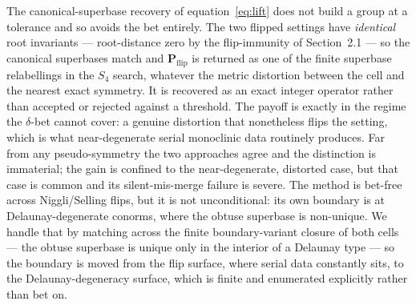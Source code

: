 \documentclass[11pt]{article}
\newcommand{\Pop}{\mathbf{P}}
\begin{document}
The canonical-superbase recovery of equation~\eqref{eq:lift} does not build a
group at a tolerance and so avoids the bet entirely. The two flipped settings have
\emph{identical} root invariants --- root-distance zero by the flip-immunity of
Section~2.1 --- so the canonical superbases match and $\Pop_{\mathrm{flip}}$ is
returned as one of the finite superbase relabellings in the $S_4$ search, whatever
the metric distortion between the cell and the nearest exact symmetry. It is
recovered as an exact integer operator rather than accepted or rejected against a
threshold. The payoff is exactly in the regime the $\delta$-bet cannot cover: a
genuine distortion that nonetheless flips the setting, which is what
near-degenerate serial monoclinic data routinely produces. Far from any
pseudo-symmetry the two approaches agree and the distinction is immaterial; the
gain is confined to the near-degenerate, distorted case, but that case is common
and its silent-mis-merge failure is severe. The method is bet-free across
Niggli/Selling flips, but it is not unconditional: its own boundary is at
Delaunay-degenerate conorms, where the obtuse superbase is non-unique. We handle
that by matching across the finite boundary-variant closure of both cells --- the
obtuse superbase is unique only in the interior of a Delaunay type --- so the
boundary is moved from the flip surface, where serial data constantly sits, to
the Delaunay-degeneracy surface, which is finite and enumerated explicitly rather
than bet on.
\end{document}
